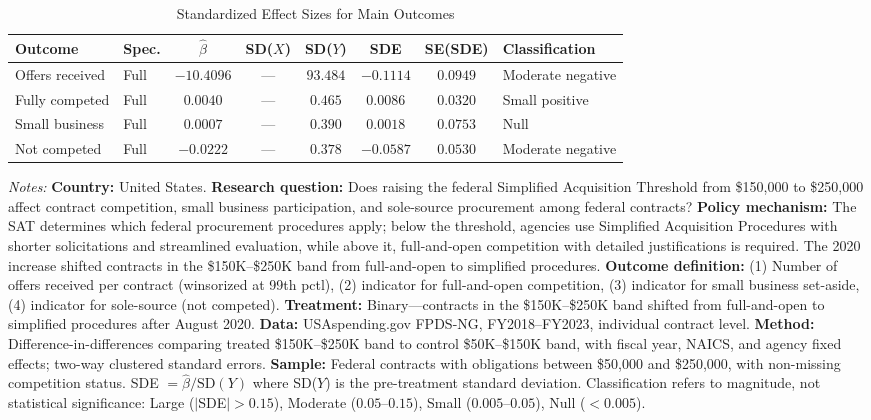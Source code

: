 \begin{table}[H]
\centering
\caption{Standardized Effect Sizes for Main Outcomes}
\label{tab:sde}
\begin{threeparttable}
\begin{adjustbox}{max width=\textwidth}
\begin{tabular}{llcccccl}
\toprule
Outcome & Spec. & $\hat{\beta}$ & SD($X$) & SD($Y$) & SDE & SE(SDE) & Classification \\
\midrule
Offers received & Full & $-10.4096$ & --- & $93.484$ & $-0.1114$ & $0.0949$ & Moderate negative \\
Fully competed & Full & $0.0040$ & --- & $0.465$ & $0.0086$ & $0.0320$ & Small positive \\
Small business & Full & $0.0007$ & --- & $0.390$ & $0.0018$ & $0.0753$ & Null \\
Not competed & Full & $-0.0222$ & --- & $0.378$ & $-0.0587$ & $0.0530$ & Moderate negative \\
\bottomrule
\end{tabular}
\end{adjustbox}
\par\vspace{0.3em}
\begin{minipage}{\textwidth}
\footnotesize
\textit{Notes:} \textbf{Country:} United States. \textbf{Research question:} Does raising the federal Simplified Acquisition Threshold from \$150,000 to \$250,000 affect contract competition, small business participation, and sole-source procurement among federal contracts? \textbf{Policy mechanism:} The SAT determines which federal procurement procedures apply; below the threshold, agencies use Simplified Acquisition Procedures with shorter solicitations and streamlined evaluation, while above it, full-and-open competition with detailed justifications is required. The 2020 increase shifted contracts in the \$150K--\$250K band from full-and-open to simplified procedures. \textbf{Outcome definition:} (1) Number of offers received per contract (winsorized at 99th pctl), (2) indicator for full-and-open competition, (3) indicator for small business set-aside, (4) indicator for sole-source (not competed). \textbf{Treatment:} Binary---contracts in the \$150K--\$250K band shifted from full-and-open to simplified procedures after August 2020. \textbf{Data:} USAspending.gov FPDS-NG, FY2018--FY2023, individual contract level. \textbf{Method:} Difference-in-differences comparing treated \$150K--\$250K band to control \$50K--\$150K band, with fiscal year, NAICS, and agency fixed effects; two-way clustered standard errors. \textbf{Sample:} Federal contracts with obligations between \$50,000 and \$250,000, with non-missing competition status. SDE $= \hat{\beta} / \text{SD}(Y)$ where SD($Y$) is the pre-treatment standard deviation. Classification refers to magnitude, not statistical significance: Large ($|$SDE$| > 0.15$), Moderate ($0.05$--$0.15$), Small ($0.005$--$0.05$), Null ($< 0.005$).
\end{minipage}
\end{threeparttable}
\end{table}
